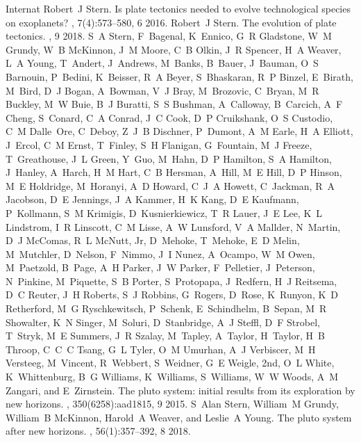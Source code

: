 \documentclass[letterpaper,10pt,english]{jupyterBook}
\begin{document}
\begin{sphinxthebibliography}{Internat}
\sphinxAtStartPar
Robert J Stern. Is plate tectonics needed to evolve technological species on exoplanets? , 7(4):573–580, 6 2016.
\sphinxAtStartPar
Robert J Stern. The evolution of plate tectonics. , 9 2018.
\sphinxAtStartPar
S A Stern, F Bagenal, K Ennico, G R Gladstone, W M Grundy, W B McKinnon, J M Moore, C B Olkin, J R Spencer, H A Weaver, L A Young, T Andert, J Andrews, M Banks, B Bauer, J Bauman, O S Barnouin, P Bedini, K Beisser, R A Beyer, S Bhaskaran, R P Binzel, E Birath, M Bird, D J Bogan, A Bowman, V J Bray, M Brozovic, C Bryan, M R Buckley, M W Buie, B J Buratti, S S Bushman, A Calloway, B Carcich, A F Cheng, S Conard, C A Conrad, J C Cook, D P Cruikshank, O S Custodio, C M Dalle Ore, C Deboy, Z J B Dischner, P Dumont, A M Earle, H A Elliott, J Ercol, C M Ernst, T Finley, S H Flanigan, G Fountain, M J Freeze, T Greathouse, J L Green, Y Guo, M Hahn, D P Hamilton, S A Hamilton, J Hanley, A Harch, H M Hart, C B Hersman, A Hill, M E Hill, D P Hinson, M E Holdridge, M Horanyi, A D Howard, C J A Howett, C Jackman, R A Jacobson, D E Jennings, J A Kammer, H K Kang, D E Kaufmann, P Kollmann, S M Krimigis, D Kusnierkiewicz, T R Lauer, J E Lee, K L Lindstrom, I R Linscott, C M Lisse, A W Lunsford, V A Mallder, N Martin, D J McComas, R L McNutt, Jr, D Mehoke, T Mehoke, E D Melin, M Mutchler, D Nelson, F Nimmo, J I Nunez, A Ocampo, W M Owen, M Paetzold, B Page, A H Parker, J W Parker, F Pelletier, J Peterson, N Pinkine, M Piquette, S B Porter, S Protopapa, J Redfern, H J Reitsema, D C Reuter, J H Roberts, S J Robbins, G Rogers, D Rose, K Runyon, K D Retherford, M G Ryschkewitsch, P Schenk, E Schindhelm, B Sepan, M R Showalter, K N Singer, M Soluri, D Stanbridge, A J Steffl, D F Strobel, T Stryk, M E Summers, J R Szalay, M Tapley, A Taylor, H Taylor, H B Throop, C C C Tsang, G L Tyler, O M Umurhan, A J Verbiscer, M H Versteeg, M Vincent, R Webbert, S Weidner, G E Weigle, 2nd, O L White, K Whittenburg, B G Williams, K Williams, S Williams, W W Woods, A M Zangari, and E Zirnstein. The pluto system: initial results from its exploration by new horizons. , 350(6258):aad1815, 9 2015.
\sphinxAtStartPar
S Alan Stern, William M Grundy, William B McKinnon, Harold A Weaver, and Leslie A Young. The pluto system after new horizons. , 56(1):357–392, 8 2018.

\end{sphinxthebibliography}
\end{document}
